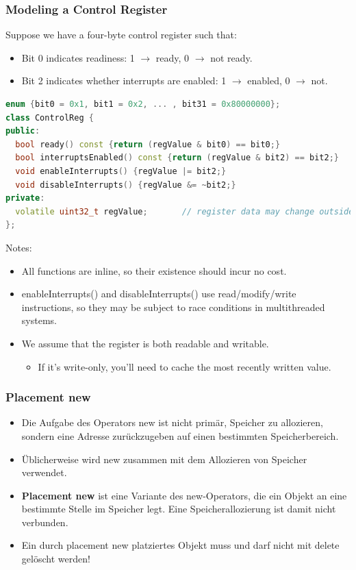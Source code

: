 \subsubsection{Modeling a Control Register}
Suppose we have a four-byte control register such that:
\begin{itemize}
  \item Bit 0 indicates readiness: 1 $\rightarrow$ ready, 0 $\rightarrow$ not ready.
  \item Bit 2 indicates whether interrupts are enabled: 1 $\rightarrow$ enabled, 0 $\rightarrow$ not.
\end{itemize}
\begin{lstlisting}[language=C++]
enum {bit0 = 0x1, bit1 = 0x2, ... , bit31 = 0x80000000};
class ControlReg {
public:
  bool ready() const {return (regValue & bit0) == bit0;}
  bool interruptsEnabled() const {return (regValue & bit2) == bit2;}
  void enableInterrupts() {regValue |= bit2;}
  void disableInterrupts() {regValue &= ~bit2;}
private:
  volatile uint32_t regValue;		// register data may change outside program control
};
\end{lstlisting}

Notes:
\begin{itemize}
  \item All functions are inline, so their existence should incur no cost.
  \item enableInterrupts() and disableInterrupts() use read/modify/write instructions, so they may be subject to race conditions in multithreaded systems.
  \item We assume that the register is both readable and writable.
  \begin{itemize}
    \item If it's write-only, you'll need to cache the most recently written value.
  \end{itemize}
\end{itemize}

\subsubsection{Placement new}
\begin{itemize}
  \item Die Aufgabe des Operators new ist nicht primär, Speicher zu allozieren, sondern eine Adresse zurückzugeben auf einen bestimmten Speicherbereich.
  \item Üblicherweise wird new zusammen mit dem Allozieren von Speicher verwendet.
  \item \textbf{Placement new} ist eine Variante des new-Operators, die ein Objekt an eine bestimmte Stelle im Speicher legt. Eine Speicherallozierung ist damit nicht verbunden.
  \item Ein durch placement new platziertes Objekt muss und darf nicht mit delete gelöscht werden!
\end{itemize}


